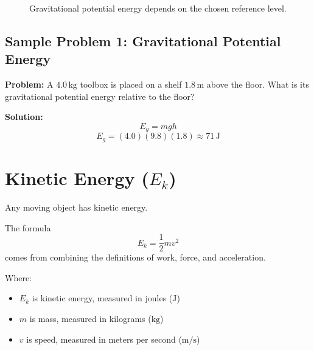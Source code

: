 \begin{figure}[h]
    \centering
    \caption{Gravitational potential energy depends on the chosen reference level.}
\end{figure}

\subsection*{Sample Problem 1: Gravitational Potential Energy}
\textbf{Problem:} A $4.0\,\text{kg}$ toolbox is placed on a shelf $1.8\,\text{m}$ above the floor. What is its gravitational potential energy relative to the floor?

\textbf{Solution:}
\begin{equation*}
    E_g = mgh
\end{equation*}
\begin{equation*}
    E_g = (4.0)(9.8)(1.8) \approx 71\,\text{J}
\end{equation*}

\section{Kinetic Energy ($E_k$)}
Any moving object has kinetic energy.

The formula
\begin{equation*}
    E_k = \frac{1}{2}mv^2
\end{equation*}
comes from combining the definitions of work, force, and acceleration.

Where:
\begin{itemize}
    \item $E_k$ is kinetic energy, measured in joules ($\text{J}$)
    \item $m$ is mass, measured in kilograms ($\text{kg}$)
    \item $v$ is speed, measured in meters per second ($\text{m/s}$)
\end{itemize}

